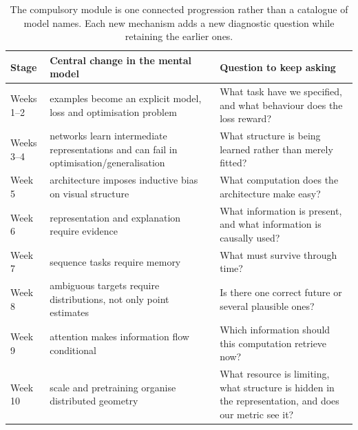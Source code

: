 \begin{table}[ht]
\centering
\small
\begin{tabular}{p{}p{}p{}}
\toprule
Stage & Central change in the mental model & Question to keep asking \\
\midrule
Weeks 1--2 & examples become an explicit model, loss and optimisation problem & What task have we specified, and what behaviour does the loss reward? \\
Weeks 3--4 & networks learn intermediate representations and can fail in optimisation/generalisation & What structure is being learned rather than merely fitted? \\
Week 5 & architecture imposes inductive bias on visual structure & What computation does the architecture make easy? \\
Week 6 & representation and explanation require evidence & What information is present, and what information is causally used? \\
Week 7 & sequence tasks require memory & What must survive through time? \\
Week 8 & ambiguous targets require distributions, not only point estimates & Is there one correct future or several plausible ones? \\
Week 9 & attention makes information flow conditional & Which information should this computation retrieve now? \\
Week 10 & scale and pretraining organise distributed geometry & What resource is limiting, what structure is hidden in the representation, and does our metric see it? \\
\bottomrule
\end{tabular}
\caption{The compulsory module is one connected progression rather than a catalogue of model names. Each new mechanism adds a new diagnostic question while retaining the earlier ones.}
\label{tab:week10-learning-thread}
\end{table}

